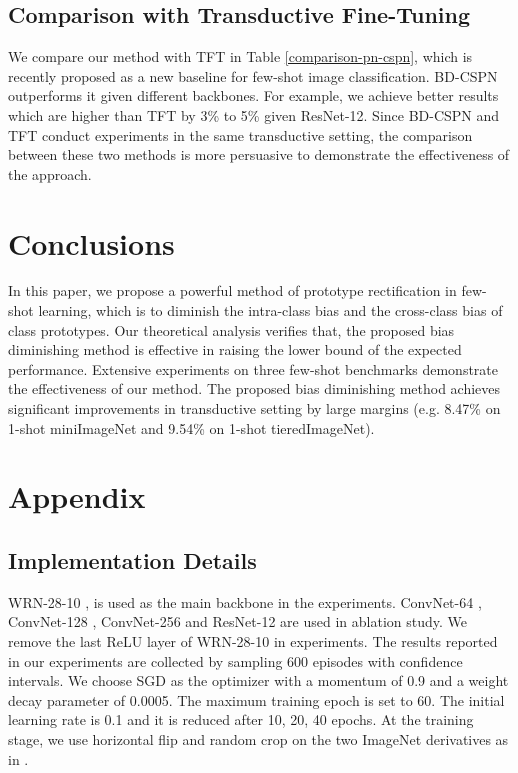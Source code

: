 \documentclass[runningheads]{llncs}
\begin{document}
\subsection{Comparison with Transductive Fine-Tuning}
We compare our method with TFT \cite{dhillon2020a} in Table \ref{comparison-pn-cspn}, which is recently proposed as a new baseline for few-shot image classification. BD-CSPN outperforms it given different backbones. For example, we achieve better results which are higher than TFT by 3\% to 5\% given ResNet-12. Since BD-CSPN and TFT conduct experiments in the same transductive setting, the comparison between these two methods is more persuasive to demonstrate the effectiveness of the approach. 






\section{Conclusions}
In this paper, we propose a powerful method of prototype rectification in few-shot learning, which is to diminish the intra-class bias and the cross-class bias of class prototypes. Our theoretical analysis verifies that, the proposed bias diminishing method is effective in raising the lower bound of the expected performance.
Extensive experiments on three few-shot benchmarks demonstrate the effectiveness of our method. The proposed bias diminishing method achieves significant improvements in transductive setting by large margins (e.g. 8.47\% on 1-shot miniImageNet and 9.54\% on 1-shot tieredImageNet).


\appendix

\section{Appendix}

\subsection{Implementation Details}
WRN-28-10 \cite{zagoruyko2016wide}, is used as the main backbone in the experiments. ConvNet-64 \cite{dhillon2020a}, ConvNet-128 \cite{gidaris2018dynamic}, ConvNet-256 \cite{kim2019edge} and ResNet-12 \cite{lee2019meta} are used in ablation study. We remove the last ReLU layer of WRN-28-10 in experiments. The results reported in our experiments are collected by sampling 600 episodes with  confidence intervals. We choose SGD as the optimizer with a momentum of 0.9 and a weight decay parameter of 0.0005. The maximum training epoch is set to 60. The initial learning rate is 0.1 and it is reduced after 10, 20, 40 epochs. At the training stage, we use horizontal flip and random crop on the two ImageNet derivatives as in \cite{gidaris2018dynamic,qiao2018few,lee2019meta}.
\end{document}

